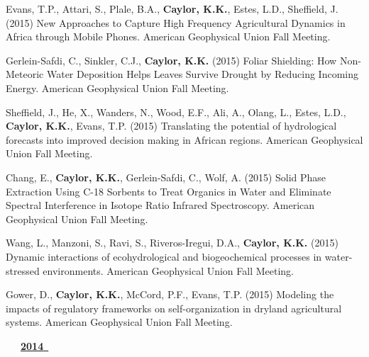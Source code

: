\begin{etaremune}
\item Evans, T.P., Attari, S., Plale, B.A., \textbf{ Caylor, K.K.}, Estes, L.D., Sheffield, J. (2015) New Approaches to Capture High Frequency Agricultural Dynamics in Africa through Mobile Phones. American Geophysical Union Fall Meeting.
\item Gerlein-Safdi, C., Sinkler, C.J., \textbf{ Caylor, K.K.} (2015) Foliar Shielding: How Non-Meteoric Water Deposition Helps Leaves Survive Drought by Reducing Incoming Energy. American Geophysical Union Fall Meeting.
\item Sheffield, J., He, X., Wanders, N., Wood, E.F., Ali, A., Olang, L., Estes, L.D., \textbf{ Caylor, K.K.}, Evans, T.P. (2015) Translating the potential of hydrological forecasts into improved decision making in African regions. American Geophysical Union Fall Meeting.
\item Chang, E., \textbf{ Caylor, K.K.}, Gerlein-Safdi, C., Wolf, A. (2015) Solid Phase Extraction Using C-18 Sorbents to Treat Organics in Water and Eliminate Spectral Interference in Isotope Ratio Infrared Spectroscopy. American Geophysical Union Fall Meeting.
\item Wang, L., Manzoni, S., Ravi, S., Riveros-Iregui, D.A., \textbf{ Caylor, K.K.} (2015) Dynamic interactions of ecohydrological and biogeochemical processes in water-stressed environments. American Geophysical Union Fall Meeting.
\item Gower, D., \textbf{ Caylor, K.K.}, McCord, P.F., Evans, T.P. (2015) Modeling the impacts of regulatory frameworks on self-organization in dryland agricultural systems. American Geophysical Union Fall Meeting.

\vspace{0.1in}
\mbox{\ \ \ \underline{\textbf{2014 }}}
\vspace{0.1in}


\end{etaremune}

